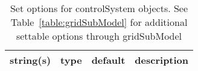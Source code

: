\begin{table}[ht]
\centering
\begin{tabular}{p{5cm} c c p{7cm}}
\hline
string(s) & type & default & description \\
\hline
\hline
\end{tabular}
\caption{Set options for controlSystem objects. See Table~\ref{table:gridSubModel} for additional settable options through gridSubModel}
\label{table:controlSystem}
\end{table}


